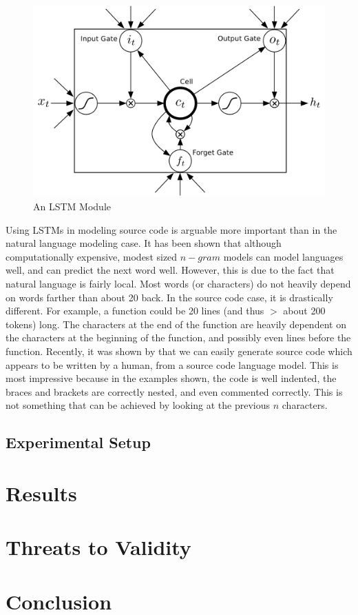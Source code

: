 \documentclass{article}
\begin{document}
\begin{figure}
  \includegraphics[width=\linewidth]{LSTM}
  \caption{An LSTM Module}
  \label{fig:LSTM}
\end{figure}


Using LSTMs in modeling source code is arguable more important than in the natural language modeling case. It has been shown that although computationally expensive, modest sized $n-gram$ models can model languages well, and can predict the next word well. However, this is due to the fact that natural language is fairly local. Most words (or characters) do not heavily depend on words farther than about 20 back. In the source code case, it is drastically different. For example, a function could be 20 lines (and thus $>$ about 200 tokens) long. The characters at the end of the function are heavily dependent on the characters at the beginning of the function, and possibly even lines before the function. Recently, it was shown by \cite{karpathy2015visualizing} that we can easily generate source code which appears to be written by a human, from a source code language model. This is most impressive because in the examples shown, the code is well indented, the braces and brackets are correctly nested, and even commented correctly. This is not something that can be achieved by looking at the previous $n$ characters.

\subsection{Experimental Setup}


\section{Results}


\section{Threats to Validity}

\section{Conclusion}







\end{document}
